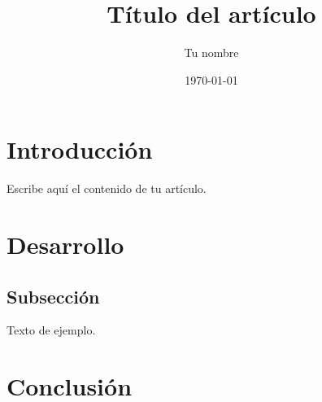 \documentclass[11pt]{article}
\title{Título del artículo}
\author{Tu nombre}
\date{\today}
\begin{document}
\maketitle

\section{Introducción}

Escribe aquí el contenido de tu artículo.

\section{Desarrollo}

\subsection{Subsección}

Texto de ejemplo.

\section{Conclusión}
\end{document}
